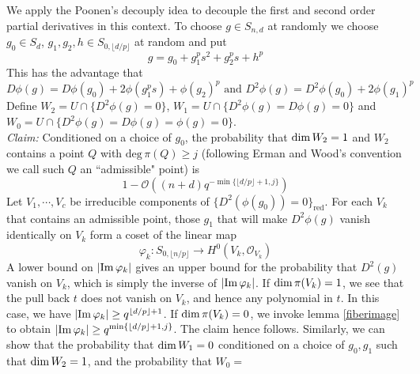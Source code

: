 \documentclass[12pt]{article}
\theoremstyle{plain}
\theoremstyle{definition}
\newcommand{\sO}{\mathcal{O}}
\renewcommand{\deg}{\mathrm{deg}\,}
\renewcommand\dim{{\rm dim\,}}
\newcommand{\im}{{\rm Im\,}}
\newcommand{\<}{\langle}
\renewcommand{\>}{\rangle}
\begin{document}
We apply the Poonen's decouply idea to decouple the first and second order partial derivatives in this context. To choose $g \in S_{n, d}$ at randomly we choose $g_0 \in S_d$, $g_1, g_2, h \in S_{0, \lfloor d/p \rfloor} $ at random and put 
$$ g = g_0 + g_1^p s^2 + g_2^p s + h^p $$ This has the advantage that 
$$ D \phi(g) = D \phi(g_0) + 2 \phi(g_1^p s) + \phi(g_2)^p \text{ and } D^2 \phi(g) = D^2 \phi(g_0) + 2 \phi(g_1)^p $$
Define $W_2 = U \cap \{ D^2 \phi(g) = 0 \}$, $W_1 = U \cap \{D^2 \phi(g) = D \phi(g) = 0\}$ and $W_0 = U \cap \{ D^2 \phi(g) = D \phi(g) = \phi(g) = 0\}$. \\
\textit{Claim: }Conditioned on a choice of $g_0$, the probability that $\dim W_2 = 1$ and $W_2$ contains a point $Q$ with $\deg \pi(Q) \ge j$ (following Erman and Wood's convention we call such $Q$ an ``admissible" point) is $$1 - \sO((n + d)q^{- \min\{ \lfloor d/p \rfloor + 1, j\}})$$ Let $V_1, \cdots, V_c$ be irreducible components of $\{D^2(\phi(g_0)) = 0\}_{\mathrm{red}}$. For each $V_k$ that contains an admissible point, those $g_1$ that will make $D^2 \phi(g)$ vanish identically on $V_k$ form a coset of the linear map $$ \varphi_k : S_{0, \lfloor n/p \rfloor} \to H^0(V_k, \sO_{V_k})$$ A lower bound on $|\im \varphi_k|$ gives an upper bound for the probability that $D^2(g)$ vanish on $V_k$, which is simply the inverse of $|\im \varphi_k|$. If $\dim \pi(V_k) = 1$, we see that the pull back $t$ does not vanish on $V_k$, and hence any polynomial in $t$. In this case, we have $|\im \varphi_k| \ge q^{\lfloor d/p \rfloor + 1}$. If $\dim \pi(V_k) = 0$, we invoke lemma \ref{fiberimage} to obtain $|\im \varphi_k| \ge q^{\min \{\lfloor d/p \rfloor + 1, j \}  }$. The claim hence follows. Similarly, we can show that the probability that $\dim W_1 = 0$ conditioned on a choice of $g_0, g_1$ such that $\dim W_2 = 1$, and the probability that $W_0 = $ 
\end{document}

